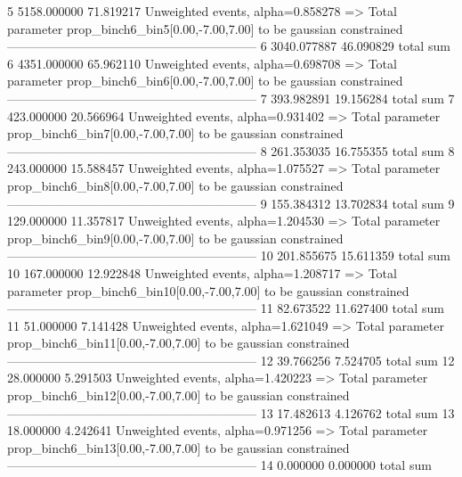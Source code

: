 5          5158.000000     71.819217       Unweighted events, alpha=0.858278
  => Total parameter prop_binch6_bin5[0.00,-7.00,7.00] to be gaussian constrained
------------------------------------------------------------
6          3040.077887     46.090829       total sum                     
6          4351.000000     65.962110       Unweighted events, alpha=0.698708
  => Total parameter prop_binch6_bin6[0.00,-7.00,7.00] to be gaussian constrained
------------------------------------------------------------
7          393.982891      19.156284       total sum                     
7          423.000000      20.566964       Unweighted events, alpha=0.931402
  => Total parameter prop_binch6_bin7[0.00,-7.00,7.00] to be gaussian constrained
------------------------------------------------------------
8          261.353035      16.755355       total sum                     
8          243.000000      15.588457       Unweighted events, alpha=1.075527
  => Total parameter prop_binch6_bin8[0.00,-7.00,7.00] to be gaussian constrained
------------------------------------------------------------
9          155.384312      13.702834       total sum                     
9          129.000000      11.357817       Unweighted events, alpha=1.204530
  => Total parameter prop_binch6_bin9[0.00,-7.00,7.00] to be gaussian constrained
------------------------------------------------------------
10         201.855675      15.611359       total sum                     
10         167.000000      12.922848       Unweighted events, alpha=1.208717
  => Total parameter prop_binch6_bin10[0.00,-7.00,7.00] to be gaussian constrained
------------------------------------------------------------
11         82.673522       11.627400       total sum                     
11         51.000000       7.141428        Unweighted events, alpha=1.621049
  => Total parameter prop_binch6_bin11[0.00,-7.00,7.00] to be gaussian constrained
------------------------------------------------------------
12         39.766256       7.524705        total sum                     
12         28.000000       5.291503        Unweighted events, alpha=1.420223
  => Total parameter prop_binch6_bin12[0.00,-7.00,7.00] to be gaussian constrained
------------------------------------------------------------
13         17.482613       4.126762        total sum                     
13         18.000000       4.242641        Unweighted events, alpha=0.971256
  => Total parameter prop_binch6_bin13[0.00,-7.00,7.00] to be gaussian constrained
------------------------------------------------------------
14         0.000000        0.000000        total sum                     
